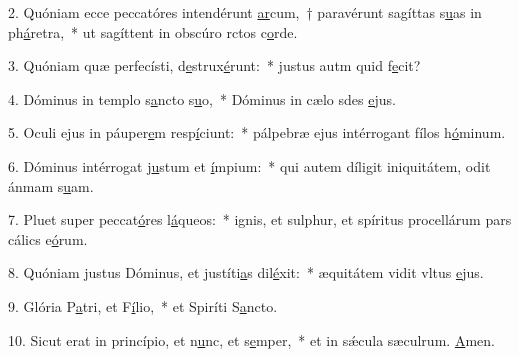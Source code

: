 2. Quóniam ecce peccatóres intendérunt \uline{ar}cum,~† paravérunt sagíttas s\uline{u}as in ph\uline{á}retra,~* ut sagíttent in obscúro rctos c\uline{o}rde.\par 
3. Quóniam quæ perfecísti, d\uline{e}strux\uline{é}runt:~* justus autm quid f\uline{e}cit?\par 
4. Dóminus in templo s\uline{a}ncto s\uline{u}o,~* Dóminus in cælo sdes \uline{e}jus.\par 
5. Oculi ejus in páuper\uline{e}m resp\uline{í}ciunt:~* pálpebræ ejus intérrogant fílos h\uline{ó}minum.\par 
6. Dóminus intérrogat j\uline{u}stum et \uline{í}mpium:~* qui autem díligit iniquitátem, odit ánmam s\uline{u}am.\par 
7. Pluet super peccat\uline{ó}res l\uline{á}queos:~* ignis, et sulphur, et spíritus procellárum pars cálics e\uline{ó}rum.\par 
8. Quóniam justus Dóminus, et justíti\uline{a}s dil\uline{é}xit:~* æquitátem vidit vltus \uline{e}jus.\par 
9. Glória P\uline{a}tri, et F\uline{í}lio,~* et Spiríti S\uline{a}ncto.\par 
10. Sicut erat in princípio, et n\uline{u}nc, et s\uline{e}mper,~* et in sǽcula sæculrum. \uline{A}men.\par 

